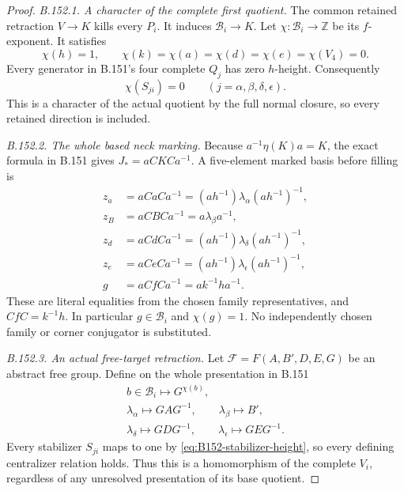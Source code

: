 \begin{proof}
\emph{B.152.1. A character of the complete first quotient.}
The common retained retraction \(V\to K\) kills every \(P_i\).
It induces \(\mathcal B_i\to K\). Let
\(\chi:\mathcal B_i\to\mathbb Z\) be its \(f\)-exponent.
It satisfies
\[
 \chi(h)=1,\qquad
 \chi(k)=\chi(a)=\chi(d)=\chi(e)=\chi(V_4)=0.
\]
Every generator in B.151's four complete \(Q_j\) has
zero \(h\)-height. Consequently
\begin{equation}\label{eq:B152-stabilizer-height}
 \chi(S_{ji})=0\qquad(j=\alpha,\beta,\delta,\epsilon).
\end{equation}
This is a character of the actual quotient by the full normal
closure, so every retained direction is included.

\emph{B.152.2. The whole based neck marking.}
Because \(a^{-1}\eta(K)a=K\), the exact formula in B.151
gives \(J_*=aCKCa^{-1}\). A five-element marked basis before
filling is
\begin{equation}\label{eq:B152-basis}
\begin{aligned}
 z_a&=aCaCa^{-1}
       =(ah^{-1})\lambda_\alpha(ah^{-1})^{-1},\\
 z_B&=aCBCa^{-1}=a\lambda_\beta a^{-1},\\
 z_d&=aCdCa^{-1}
       =(ah^{-1})\lambda_\delta(ah^{-1})^{-1},\\
 z_e&=aCeCa^{-1}
       =(ah^{-1})\lambda_\epsilon(ah^{-1})^{-1},\\
 g&=aCfCa^{-1}=ak^{-1}ha^{-1}.
\end{aligned}
\end{equation}
These are literal equalities from the chosen family
representatives, and \(CfC=k^{-1}h\). In particular
\(g\in\mathcal B_i\) and \(\chi(g)=1\). No independently
chosen family or corner conjugator is substituted.

\emph{B.152.3. An actual free-target retraction.}
Let \(\mathcal F=F(A,B',D,E,G)\) be an abstract free group.
Define on the whole presentation in B.151
\begin{equation}\label{eq:B152-map}
\begin{gathered}
 b\in\mathcal B_i\longmapsto G^{\chi(b)},\\
 \lambda_\alpha\longmapsto GAG^{-1},\qquad
 \lambda_\beta\longmapsto B',\\
 \lambda_\delta\longmapsto GDG^{-1},\qquad
 \lambda_\epsilon\longmapsto GEG^{-1}.
\end{gathered}
\end{equation}
Every stabilizer \(S_{ji}\) maps to one by
\eqref{eq:B152-stabilizer-height}, so every defining
centralizer relation holds. Thus this is a homomorphism
of the complete \(V_i\), regardless of any unresolved
presentation of its base quotient.


\end{proof}
